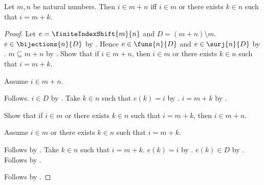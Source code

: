 \begin{proposition}\label{natural_sum_member_iff}
    Let $m,n$ be natural numbers.
    Then $i\in m+n$ iff $i\in m$ or there exists $k\in n$ such that $i=m+k$.
\end{proposition}
\begin{proof}
    Let $e=\finiteIndexShift{m}{n}$ and $D=(m+n)\setminus m$.
    $e\in\bijections{n}{D}$ by .
    Hence $e\in\funs{n}{D}$ and $e\in\surj{n}{D}$ by .
    $m\subseteq m+n$ by .
    Show that if $i\in m+n$, then $i\in m$ or there exists $k\in n$ such that $i=m+k$.
    \begin{subproof}
        Assume $i\in m+n$.
        \begin{byCase}
                Follows.
                $i\in D$ by .
                Take $k\in n$ such that $e(k)=i$ by .
                $i=m+k$ by .
        \end{byCase}
    \end{subproof}
    Show that if $i\in m$ or there exists $k\in n$ such that $i=m+k$, then $i\in m+n$.
    \begin{subproof}
        Assume $i\in m$ or there exists $k\in n$ such that $i=m+k$.
        \begin{byCase}
                Follows by .
                Take $k\in n$ such that $i=m+k$.
                $e(k)=i$ by .
                $e(k)\in D$ by .
                Follows by .
        \end{byCase}
    \end{subproof}
    Follows by \auto.
\end{proof}
